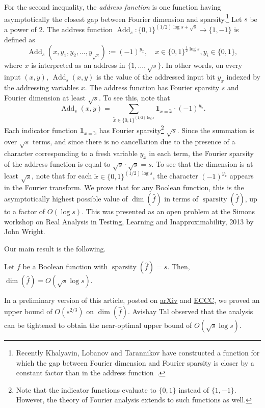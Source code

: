 \documentclass{toc}
\DeclareMathOperator{\spa}{sparsity}
\DeclareMathOperator{\dimn}{dim}
\DeclareMathOperator{\Add}{Add}   %
\begin{document}
For the second inequality, the \textit{address function} is one function
having asymptotically the closest gap between Fourier dimension and sparsity.\footnote{Recently Khalyavin, Lobanov and Tarannikov have constructed a function for which the gap between Fourier dimension and Fourier sparsity is closer by a constant factor than in the address function~\cite{khalyavin}.} Let $s$ be a power of $2$. The address function
 $\Add_s:\{0,1\}^{(1/2) \log s +
  \sqrt{s}}\to \{1,-1\}$ is defined
as $$\Add_s(x,y_1,y_2,\dots,y_{\sqrt{s}}) := (-1)^{y_x}, \quad x \in \{0,1\}^{\frac12\log s}, y_i \in \{0,1\},$$ where $x$ is interpreted as an address in $\{1, \ldots, \sqrt s\}$. In other words, on every input
$(x,y)$, $\Add_s(x,y)$ is the value of the
%
addressed    %
input bit $y_x$
indexed by the addressing variables $x$. The address function has
Fourier sparsity $s$ and Fourier dimension at least $\sqrt{s}$. To see this, note that
\[
  \Add_s(x,y)=\sum_{\tilde{x} \in \{0,1\}^{({1}/{2}) \log s}} \mathbf{1}_{x=\tilde{x}}\cdot (-1)^{y_{\tilde{x}}}.
\]
Each indicator function $\mathbf{1}_{x=\tilde{x}}$ has Fourier
%
%
sparsity\footnote{Note    %
  that the indicator functions evaluate to $\{0,1\}$ instead of $\{1,-1\}$. However, the theory of Fourier analysis extends to such functions as well.}
$\sqrt{s}$.   %
Since the summation is over $\sqrt{s}$ terms, and since there is no
%
%
cancellation due to the presence of a character corresponding to a fresh variable $y_{\tilde{x}}$ in each term, the Fourier sparsity of the address function is equal to $\sqrt s\cdot \sqrt s=s$. To see that the dimension is at least $\sqrt{s}$, note that for each $\tilde{x} \in \{0,1\}^{({1}/{2})\log s}$, the character $(-1)^{y_{\tilde{x}}}$ appears in the Fourier transform.
%
%
We prove that for any Boolean function, this is the asymptotically highest possible value of $\dimn(\widehat{f})$ in terms of
$\spa(\widehat{f})$, up to a factor of $O(\log s)$. This was presented as an open problem at the Simons workshop on Real Analysis in Testing, Learning and Inapproximability, 2013 by John Wright.

Our main result is the following. %
\begin{theorem}
 \label{thm:th1}
Let $f$ be a Boolean function with $\spa(\widehat{f})=s$. Then, $\dimn(\widehat{f})=O\left(\sqrt{s} \log s \right)$.
\end{theorem}
%
In a  %
preliminary version of this
%
article, %
%
%
posted on \href{http://arxiv.org/abs/1407.3500}{arXiv} and   %
\href{https://eccc.weizmann.ac.il/report/2014/088/}{ECCC},   %
we proved an upper bound of $O(s^{2/3})$ on $\dimn(\widehat{f})$.
Avishay Tal observed that the analysis can be tightened to
%
obtain  %
the
near-optimal upper bound of $O\left(\sqrt{s} \log s \right)$.
\end{document}
